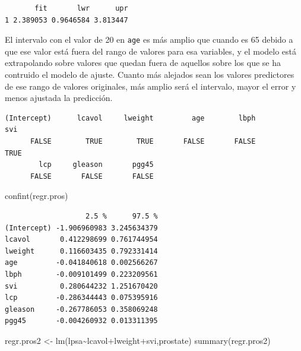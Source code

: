 \documentclass[
  letterpaper,
  DIV=11,
  numbers=noendperiod]{scrartcl}
\newenvironment{Shaded}{\begin{snugshade}}{\end{snugshade}}
\newcommand{\DecValTok}[1]{\textcolor[rgb]{0.68,0.00,0.00}{#1}}
\newcommand{\FloatTok}[1]{\textcolor[rgb]{0.68,0.00,0.00}{#1}}
\newcommand{\FunctionTok}[1]{\textcolor[rgb]{0.28,0.35,0.67}{#1}}
\newcommand{\NormalTok}[1]{\textcolor[rgb]{0.00,0.23,0.31}{#1}}
\newcommand{\OtherTok}[1]{\textcolor[rgb]{0.00,0.23,0.31}{#1}}
\newcommand{\SpecialCharTok}[1]{\textcolor[rgb]{0.37,0.37,0.37}{#1}}
\begin{document}
\begin{verbatim}
       fit       lwr      upr
1 2.389053 0.9646584 3.813447
\end{verbatim}

El intervalo con el valor de 20 en \texttt{age} es más amplio que cuando
es 65 debido a que ese valor está fuera del rango de valores para esa
variables, y el modelo está extrapolando sobre valores que quedan fuera
de aquellos sobre los que se ha contruido el modelo de ajuste. Cuanto
más alejados sean los valores predictores de ese rango de valores
originales, más amplio será el intervalo, mayor el error y menos
ajustada la predicción.

\begin{Shaded}
\end{Shaded}

\begin{verbatim}
(Intercept)      lcavol     lweight         age        lbph         svi 
      FALSE        TRUE        TRUE       FALSE       FALSE        TRUE 
        lcp     gleason       pgg45 
      FALSE       FALSE       FALSE 
\end{verbatim}

\hfill\break

\begin{Shaded}
\begin{Highlighting}[]
 \FunctionTok{confint}\NormalTok{(regr.pros)}
\end{Highlighting}
\end{Shaded}

\begin{verbatim}
                   2.5 %      97.5 %
(Intercept) -1.906960983 3.245634379
lcavol       0.412298699 0.761744954
lweight      0.116603435 0.792331414
age         -0.041840618 0.002566267
lbph        -0.009101499 0.223209561
svi          0.280644232 1.251670420
lcp         -0.286344443 0.075395916
gleason     -0.267786053 0.358069248
pgg45       -0.004260932 0.013311395
\end{verbatim}

\begin{Shaded}
\begin{Highlighting}[]
\NormalTok{regr.pros2 }\OtherTok{\textless{}{-}} \FunctionTok{lm}\NormalTok{(lpsa}\SpecialCharTok{\textasciitilde{}}\NormalTok{lcavol}\SpecialCharTok{+}\NormalTok{lweight}\SpecialCharTok{+}\NormalTok{svi,prostate)}
\FunctionTok{summary}\NormalTok{(regr.pros2)}
\end{Highlighting}
\end{Shaded}
\end{document}
